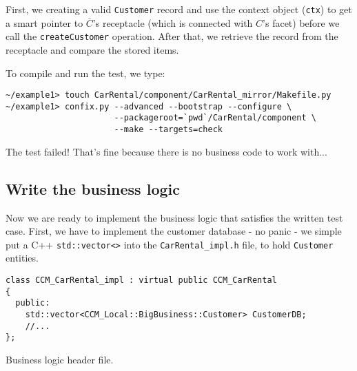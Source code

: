 First, we creating a valid {\tt Customer} record and  
use the context object ({\tt ctx}) to get a smart pointer
to $\overline{C}$'s receptacle (which is connected with $C$'s facet) 
before we call the {\tt createCustomer} operation. 
After that, we retrieve the record from the receptacle and compare the stored 
items.

To compile and run the test, we type:
\begin{small}
\begin{verbatim}
~/example1> touch CarRental/component/CarRental_mirror/Makefile.py
~/example1> confix.py --advanced --bootstrap --configure \
                      --packageroot=`pwd`/CarRental/component \
                      --make --targets=check
\end{verbatim}
\end{small}
The test failed! 
That's fine because there is no business code to work with...






\subsection{Write the business logic}

Now we are ready to implement the business logic that satisfies the written 
test case. 
First, we have to implement the customer database - no panic - we 
simple put a C++ {\tt std::vector<>} into the {\tt CarRental\_impl.h} file,
to hold {\tt Customer} entities.
\begin{Example}
\begin{minifbox}
\begin{small}
\begin{verbatim}
class CCM_CarRental_impl : virtual public CCM_CarRental
{
  public:
    std::vector<CCM_Local::BigBusiness::Customer> CustomerDB;
    //...
};
\end{verbatim}
\end{small}
\end{minifbox}
\caption{Business logic header file.}
\label{example:one-component-impl}
\end{Example}

